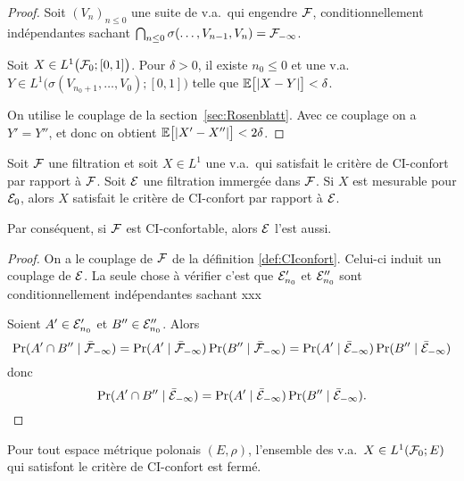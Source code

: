\documentclass[12pt,a4paper]{article}
\begin{document}
\begin{proof}
Soit ${(V_n)}_{n \leq 0}$ une suite de v.a.\ qui engendre $\mathcal{F}$, 
 conditionnellement indépendantes 
sachant $\bigcap_{n \leq 0}\sigma(\ldots, V_{n-1}, V_n) = \mathcal{F}_{-\infty}$. 

Soit $X \in L^1\bigl(\mathcal{F}_0; [0,1]\bigr)$. Pour $\delta>0$, il existe 
$n_0 \leq 0$ et une v.a.\ $Y \in L^1\bigl(\sigma(V_{n_0+1},\ldots, V_0); [0,1]\bigr)$ 
telle que $\mathbb{E}\bigl[|X-Y|\bigr] < \delta$. 
 
On utilise le couplage de la section~\ref{sec:Rosenblatt}. 
Avec ce couplage on a $Y'=Y''$, et donc on obtient 
$\mathbb{E}\bigl[|X'-X''|\bigr] < 2\delta$. 
\end{proof}


\begin{ppsition}
Soit $\mathcal{F}$ une filtration et soit $X \in L^1$ une v.a.\ qui satisfait le critère de 
CI-confort par rapport à $\mathcal{F}$. 
Soit $\mathcal{E}$ une filtration immergée dans $\mathcal{F}$. Si $X$ est mesurable pour 
$\mathcal{E}_0$, alors $X$ satisfait le critère de CI-confort par rapport à $\mathcal{E}$. 

Par conséquent, si $\mathcal{F}$ est CI-confortable, alors $\mathcal{E}$ l'est aussi. 
\end{ppsition}

\begin{proof}
On a le couplage de $\mathcal{F}$ de la définition \ref{def:CIconfort}. 
Celui-ci induit un couplage de $\mathcal{E}$. 
La seule chose à vérifier c'est que $\mathcal{E}'_{n_0}$ et $\mathcal{E}''_{n_0}$ sont 
conditionnellement indépendantes sachant xxx

Soient $A' \in \mathcal{E}'_{n_0}$ et $B'' \in \mathcal{E}''_{n_0}$. 
Alors  
$$
\Pr(A' \cap B'' \mid \bar{\mathcal{F}}_{-\infty})
= \Pr(A' \mid \bar{\mathcal{F}}_{-\infty})\Pr(B'' \mid \bar{\mathcal{F}}_{-\infty})
= \Pr(A' \mid \bar{\mathcal{E}}_{-\infty})\Pr(B'' \mid \bar{\mathcal{E}}_{-\infty})
$$
donc
$$
\Pr(A' \cap B'' \mid \bar{\mathcal{E}}_{-\infty})
= \Pr(A' \mid \bar{\mathcal{E}}_{-\infty})\Pr(B'' \mid \bar{\mathcal{E}}_{-\infty}).
$$

\end{proof}


\begin{ppsition}\label{ppsition:CIferme}
Pour tout espace métrique polonais $(E,\rho)$, 
l'ensemble des v.a.\ $X \in L^1(\mathcal{F}_0; E)$ qui satisfont le critère de CI-confort est fermé. 
\end{ppsition}
\end{document}

